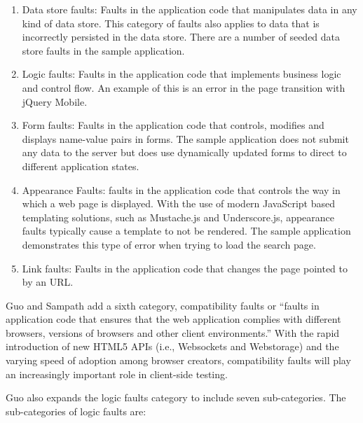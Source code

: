 \begin{enumerate}
\item Data store faults: Faults in the application code that manipulates data in any kind of data store.  This category of faults also applies to data that is incorrectly persisted in the data store.  There are a number of seeded data store faults in the sample application.

\item Logic faults: Faults in the application code that implements business logic and control flow.  An example of this is an error in the page transition with jQuery Mobile. 

\item Form faults: Faults in the application code that controls, modifies and displays name-value pairs in forms.  The sample application does not submit any data to the server but does use dynamically updated forms to direct to different application states.

\item Appearance Faults: faults in the application code that controls the way in which a web page is displayed.  With the use of modern JavaScript based templating solutions, such as Mustache.js and Underscore.js, appearance faults typically cause a template to not be rendered.  The sample application demonstrates this type of error when trying to load the search page.

\item Link faults: Faults in the application code that changes the page pointed to by an URL.
\end{enumerate}

Guo and Sampath \cite{guo2008web} add a sixth category, compatibility faults or ``faults in application code that ensures that the web application complies with different browsers, versions of browsers and other client environments.''  With the rapid introduction of new HTML5 APIs (i.e., Websockets and Webstorage) and the varying speed of adoption among browser creators, compatibility faults will play an increasingly important role in client-side testing.  

Guo also expands the logic faults category to include seven sub-categories.  The sub-categories of logic faults are:

